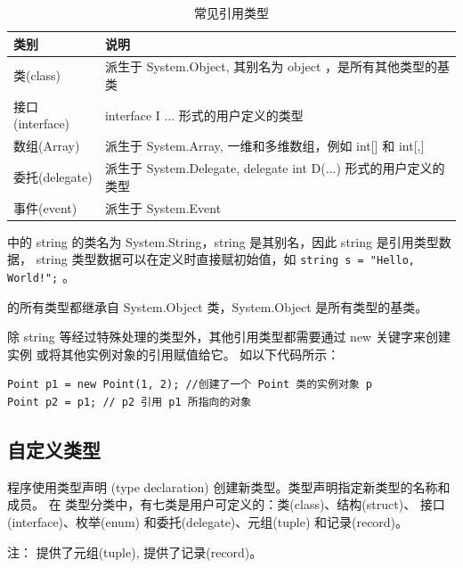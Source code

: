 \begin{table}[htbp]
    \centering
    \caption{常见引用类型}
    \label{tab:referencetype}
    \begin{tabular}{l|l}
        \hline
        类别            & 说明                                                  \\
        \hline
        类(class)      & 派生于 System.Object, 其别名为 object ，是所有其他类型的基类          \\
        接口(interface) & interface I {...} 形式的用户定义的类型                        \\
        数组(Array)     & 派生于 System.Array, 一维和多维数组，例如 int[] 和 int[,]         \\
        委托(delegate)  & 派生于 System.Delegate, delegate int D(...) 形式的用户定义的类型 \\
        事件(event)     & 派生于 System.Event                                    \\
        \hline
    \end{tabular}
\end{table}

\cs 中的 string 的类名为 System.String，string 是其别名，因此 string 是引用类型数据，
string 类型数据可以在定义时直接赋初始值，如 \verb|string s = "Hello, World!";| 。

\cs 的所有类型都继承自 System.Object 类，System.Object 是所有类型的基类。

除 string 等经过特殊处理的类型外，其他引用类型都需要通过 new 关键字来创建实例
或将其他实例对象的引用赋值给它。
如以下代码所示：

\begin{lstlisting}
Point p1 = new Point(1, 2); //创建了一个 Point 类的实例对象 p
Point p2 = p1; // p2 引用 p1 所指向的对象
\end{lstlisting}


\subsection{自定义类型}
\cs  程序使用类型声明 (type declaration) 创建新类型。类型声明指定新类型的名称和成员。
在  \cs  类型分类中，有七类是用户可定义的：类(class)、结构(struct)、
接口(interface)、枚举(enum) 和委托(delegate)、元组(tuple) 和记录(record)。

注： 提供了元组(tuple),  提供了记录(record)。

